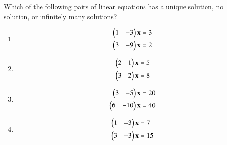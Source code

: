 %
%
\item Which of the following pairs of linear equations has a unique solution, no solution, or infinitely many solutions?
%
\begin{enumerate}[itemsep=2pt]
\item
\begin{align}
\begin{split}
\begin{pmatrix}1 & -3 \end{pmatrix}\mathbf{x}&=3
\\
\begin{pmatrix}3 & -9 \end{pmatrix}\mathbf{x}&=2
\end{split}
\label{linform/11/ab/1.0.1}
\end{align}
\item
\begin{align}
\begin{split}
\begin{pmatrix}2 & 1 \end{pmatrix}\mathbf{x}&=5
\\
\begin{pmatrix}3 & 2 \end{pmatrix}\mathbf{x}&=8
\end{split}
\label{linform/11/ab/1.0.2}
\end{align}
\item
\begin{align}
\begin{split}
\begin{pmatrix}3 & -5 \end{pmatrix}\mathbf{x}&=20
\\
\begin{pmatrix}6 & -10 \end{pmatrix}\mathbf{x}&=40
\end{split}
\end{align}
\item
\begin{align}
\begin{split}
\begin{pmatrix}1 & -3 \end{pmatrix}\mathbf{x}&=7
\\
\begin{pmatrix}3 & -3 \end{pmatrix}\mathbf{x}&=15
\end{split}
\end{align}
\end{enumerate}
%
\solution
\begin{enumerate}
    

\end{enumerate}
%



